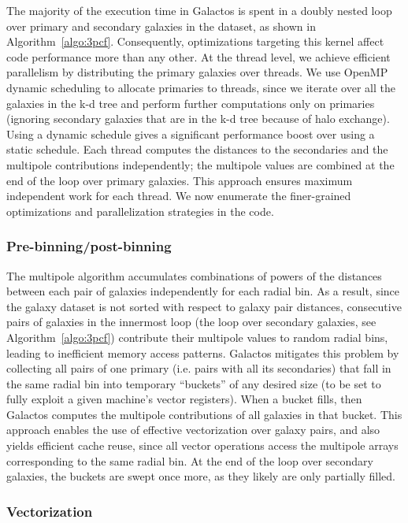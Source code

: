 The majority of the execution time in Galactos is spent in a doubly nested loop over primary and secondary galaxies in the dataset, as shown in Algorithm~\ref{algo:3pcf}.
Consequently, optimizations targeting this kernel affect code performance more than any other.
At the thread level, we achieve efficient parallelism by distributing the primary galaxies over threads. We use OpenMP dynamic scheduling to allocate primaries to threads, since we iterate over all the galaxies in the k-d tree and perform further computations only on primaries (ignoring secondary galaxies that are in the k-d tree because of halo exchange). Using a dynamic schedule gives a significant performance boost over using a static schedule. Each thread computes the distances to the secondaries and the multipole contributions independently; the multipole values are combined at the end of the loop over primary galaxies. This approach ensures maximum independent work for each thread. 
We now enumerate the finer-grained optimizations and parallelization strategies in the code.

\subsubsection{Pre-binning/post-binning}
\label{sec:binning}
The multipole algorithm accumulates combinations of powers of the distances between each pair of galaxies independently for each radial bin.
As a result, since the galaxy dataset is not sorted with respect to galaxy pair distances, consecutive pairs of galaxies in the innermost loop (the loop over secondary galaxies, see Algorithm~\ref{algo:3pcf}) contribute their multipole values to random radial bins, leading to inefficient memory access patterns.
Galactos mitigates this problem by collecting all pairs of one primary (i.e. pairs with all its secondaries) that fall in the same radial bin into temporary ``buckets'' of any desired size (to be set to fully exploit a given machine's vector registers).
When a bucket fills, then Galactos computes the multipole contributions of all galaxies in that bucket.
This approach enables the use of effective vectorization over galaxy pairs, and also yields efficient cache reuse, since all vector operations access the multipole arrays corresponding to the same radial bin.
At the end of the loop over secondary galaxies, the buckets are swept once more, as they likely are only partially filled.

\subsubsection{Vectorization}
\label{subsubsec:vectorization}

